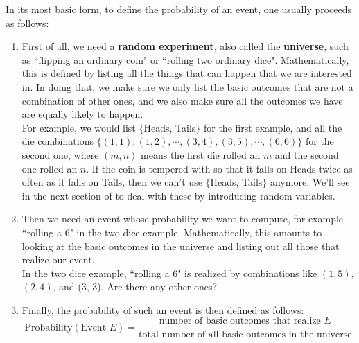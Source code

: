 
In its most basic form, to define the probability of an event, one usually proceeds as follows: \\
\begin{enumerate}[1.]
\item First of all, we need a \textbf{random experiment}, also called the \textbf{universe}, such as ``flipping an ordinary coin" or ``rolling two ordinary dice". Mathematically, this is defined by listing all the things that can happen that we are interested in. In doing that, we make sure we only list the basic outcomes that are not a combination of other ones, and we also make sure all the outcomes we have are equally likely to happen. \\

For example, we would list $\{$Heads, Tails$\}$ for the first example, and all the die combinations $\{(1,1), (1, 2),\cdots , (3, 4), (3, 5),\cdots , (6, 6)\}$ for the second one, where $(m,n)$ means the first die rolled an $m$ and the second one rolled an $n$. If the coin is tempered with so that it falls on Heads twice as often as it falls on Tails, then we can't use $\{$Heads, Tails$\}$ anymore. We'll see in the next section of to deal with these by introducing random variables.
\item Then we need an event whose probability we want to compute, for example ``rolling a 6" in the two dice example. Mathematically, this amounts to looking at the basic outcomes in the universe and listing out all those that realize our event. \\

In the two dice example, ``rolling a 6" is realized by combinations like $(1, 5)$, $(2, 4)$, and (3, 3). Are there any other ones?
\item Finally, the probability of such an event is then defined as follows: 
\[
\text{Probability}(\text{Event }E)= \frac{\text{number of basic outcomes that realize }E}{\text{total number of all basic outcomes in the universe}}
\]
\end{enumerate}




























